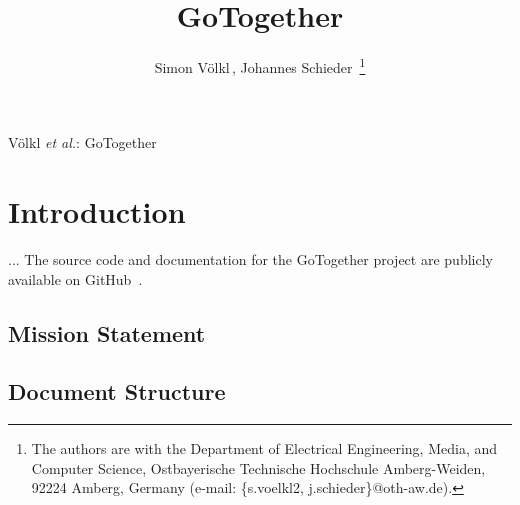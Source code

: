 \documentclass[10pt,journal,final,a4paper]{IEEEtran}
\begin{document}
\title{GoTogether} 

\author{Simon Völkl\,, 
        Johannes Schieder\,%
\thanks{The authors are with the Department of Electrical Engineering, Media, and Computer Science, Ostbayerische Technische Hochschule Amberg-Weiden, 92224 Amberg, Germany (e-mail: \{s.voelkl2, j.schieder\}@oth-aw.de).}%
}

{Völkl \MakeLowercase{\textit{et al.}}: GoTogether}

\maketitle

\begin{abstract}
\end{abstract}

\begin{IEEEkeywords}
\end{IEEEkeywords}



\section{Introduction}
\label{sec:introduction}

...
The source code and documentation for the GoTogether project are publicly available on GitHub~\cite{gotogether2026github}.


\subsection{Mission Statement}
\label{subsec:mission_statement}


\subsection{Document Structure}
\label{subsec:document_structure}
\end{document}
